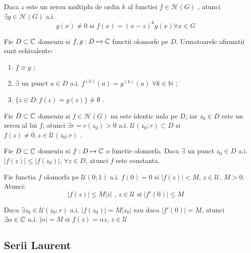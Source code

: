 \begin{theorem}
    Daca $z$ este un zerou multiplu de ordin $k$ al functiei $f \in \mathcal{H}(G)$ , atunci
    $\exists g \in \mathcal{H}(G)$ a.i.
    \[
        g(x) \neq 0 \text{ si }  f(x) = (x-z)^k g(x) \forall x \in G
    \]
\end{theorem}

\begin{theorem}
    Fie $D \subset \mathbb{C}$ domeniu si $f,g : D\mapsto \mathbb{C}$ functii olomorfe pe $D$. Urmatoarele afirmatii
    sunt echivalente:
    \begin{enumerate}
        \item $f \equiv g$ ;
        \item $\exists$ un punct $a\in D$ a.i. $f^{(k)}(a) = g^{(k)}(a)\; \forall k \in \mathbb{N}$ ;
        \item $ \{z \in D \colon f(z) = g(z)\} \neq \emptyset$ .
    \end{enumerate}
\end{theorem}

\begin{theorem}
    Fie $D \subset \mathbb{C}$ domeniu si $f\in \mathcal{H}(G)$ nu este identic nula pe $D$, iar $z_0 \in D$
    este un zerou al lui $f$, atunci $\exists r=r(z_0)>0$  a.i. $\mathcal{U}(z_0;r) \subset D $
    si $f(z) \neq 0, z\in \dot{\mathcal{U}}(z_0;r)$ .
\end{theorem}

\begin{theorem}
    Fie $D \subset \mathbb{C}$ domeniu si $f:D\mapsto \mathbb{C}$ o functie olomorfa. Daca $\exists$ un punct
    $z_0 \in D$ a.i. $|f(z)| \leq |f(z_0)|$, $\forall z \in D $, atunci $f$ este constanta.
\end{theorem}

\begin{theorem}
    Fie functia $f$ olomorfa pe $\mathcal{U}(0;1)$ a.i. $f(0) = 0$ si $|f(z)| < M$,
    $z\in \mathcal{U}$, $M>0$. Atunci:
    \[
        |f(z)| \leq M |z| \text{ , } z \in \mathcal{U} \text{ si } |f'(0)| \leq M
    \]

    Daca $\exists z_0 \in \dot{\mathcal{U}}(z_0;r)$ a.i. $|f(z_0)| = M |z_0| $ sau daca
    $|f'(0)| = M$, atunci $\exists \alpha \in \mathbb{C} $ a.i. $|\alpha| = M $ si $f(z) = \alpha z$,
    $z \in \mathcal{U}$
\end{theorem}

\subsection{Serii Laurent}

